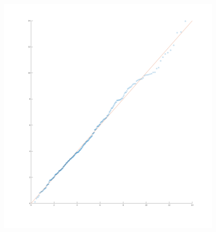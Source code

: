 \documentclass[aspectratio=169,10pt,t]{beamer}
\begin{document}
\begin{frame}[t]
\begin{columns}
\begin{column}{0.5\textwidth}
\begin{figure}[H]
                \includegraphics[scale=0.12]{images/qqnew.png}
            \end{figure}    
        \end{column}
    \end{columns}

\end{frame}
\end{document}
